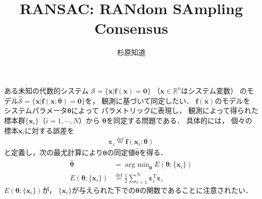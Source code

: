 ﻿\documentclass[a4paper]{jsarticle}
\title{\Large {\bf RANSAC: RANdom SAmpling Consensus}}
\author{杉原知道}
\begin{document}

\maketitle

ある未知の代数的システム
$\mathcal{S}=\{\bm{x}|\bm{f}(\bm{x})=\bm{0}\}$
（$\bm{x}\in\mathbb{R}^{n}$はシステム変数）
のモデル$\hat{\mathcal{S}}=\{\bm{x}|\hat{\bm{f}}(\bm{x};\bm{\theta})=\bm{0}\}$を，
観測に基づいて同定したい．
$\bm{f}(\bm{x})$のモデルを
システムパラメータ$\bm{\theta}$によって
パラメトリックに表現し，
観測によって得られた標本群$\{\bm{x}_{i}\}$（$i=1,\cdots,N$）から
$\bm{\theta}$を同定する問題である．
具体的には，
個々の標本$\bm{x}_{i}$に対する誤差を
\begin{align}
\bm{\varepsilon}_{i}\overset{\mathrm{def}}{=}\hat{\bm{f}}(\bm{x}_{i};\bm{\theta})
\label{eq:sample_error}
\end{align}
と定義し，次の最尤計算により$\bm{\theta}$の同定値$\hat{\bm{\theta}}$を得る．
\begin{align}
\hat{\bm{\theta}}&=\mathop{\mathrm{arg~min}}_{\bm{\theta}}E(\bm{\theta};\{\bm{x}_{i}\})
\label{eq:lsm}
\\
E(\bm{\theta};\{\bm{x}_{i}\})&\overset{\mathrm{def}}{=}\frac{1}{2}\sum_{i=1}^{N}\bm{\varepsilon}_{i}^{\mathrm{T}}\bm{\varepsilon}_{i}
\end{align}
$E(\bm{\theta};\{\bm{x}_{i}\})$が，
$\{\bm{x}_{i}\}$が与えられた下での$\bm{\theta}$の関数であることに注意されたい．
\end{document}
